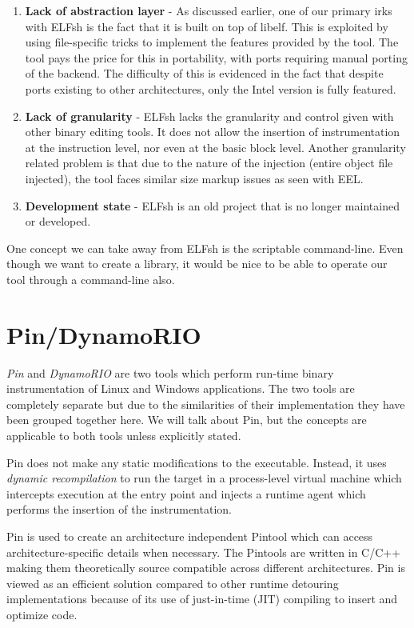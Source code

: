 \begin{enumerate}
 \item \textbf{Lack of abstraction layer} - As discussed earlier, one of our primary irks with ELFsh is the fact that it is built on top of libelf. This is exploited by using file-specific tricks to implement the features provided by the tool. The tool pays the price for this in portability, with ports requiring manual porting of the backend. The difficulty of this is evidenced in the fact that despite ports existing to other architectures, only the Intel version is fully featured.
 \item \textbf{Lack of granularity} - ELFsh lacks the granularity and control given with other binary editing tools. It does not allow the insertion of instrumentation at the instruction level, nor even at the basic block level. Another granularity related problem is that due to the nature of the injection (entire object file injected), the tool faces similar size markup issues as seen with EEL.
 \item \textbf{Development state} - ELFsh is an old project that is no longer maintained or developed.
\end{enumerate}

One concept we can take away from ELFsh is the scriptable command-line. Even though we want to create a library, it would be nice to be able to operate our tool through a command-line also.

\section{Pin/DynamoRIO}

\emph{Pin} and \emph{DynamoRIO} are two tools which perform run-time binary instrumentation of Linux and Windows applications\cite{pin,pin_windows,dynamorio}. The two tools are completely separate but due to the similarities of their implementation they have been grouped together here. We will talk about Pin, but the concepts are applicable to both tools unless explicitly stated.

Pin does not make any static modifications to the executable. Instead, it uses \emph{dynamic recompilation} to run the target in a process-level virtual machine which intercepts execution at the entry point and injects a runtime agent which performs the insertion of the instrumentation. 

Pin is used to create an architecture independent Pintool which can access architecture-specific details when necessary. The Pintools are written in C/C++ making them theoretically source compatible across different architectures. Pin is viewed as an efficient solution compared to other runtime detouring implementations because of its use of just-in-time (JIT) compiling to insert and optimize code.

